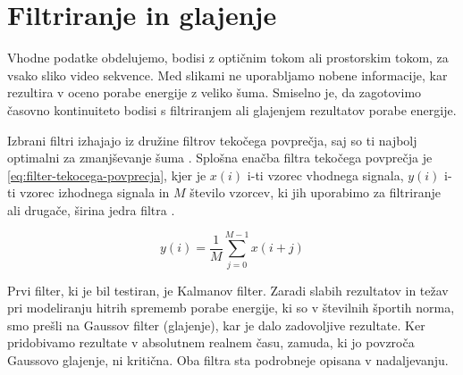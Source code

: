 \section{Filtriranje in glajenje}\label{sec:filtri}
Vhodne podatke obdelujemo, bodisi z optičnim tokom ali prostorskim tokom, za vsako sliko video sekvence. Med slikami ne uporabljamo nobene informacije, kar rezultira v oceno porabe energije z veliko šuma. Smiselno je, da zagotovimo časovno kontinuiteto bodisi s filtriranjem ali glajenjem rezultatov porabe energije.

Izbrani filtri izhajajo iz družine filtrov tekočega povprečja, saj so ti najbolj optimalni za zmanjševanje šuma \cite{smith1997scientist}. Splošna enačba filtra tekočega povprečja je \eqref{eq:filter-tekocega-povprecja}, kjer je $x(i)$ i-ti vzorec vhodnega signala, $y(i)$ i-ti vzorec izhodnega signala in $M$ število vzorcev, ki jih uporabimo za filtriranje ali drugače, širina jedra filtra \cite{smith1997scientist}.

\begin{equation}
y(i) = \frac{1}{M} \sum_{j=0}^{M-1} x(i + j)
\label{eq:filter-tekocega-povprecja}
\end{equation}

Prvi filter, ki je bil testiran, je Kalmanov filter. Zaradi slabih rezultatov in težav pri modeliranju hitrih sprememb porabe energije, ki so v številnih športih norma, smo prešli na Gaussov filter (glajenje), kar je dalo zadovoljive rezultate. Ker pridobivamo rezultate v absolutnem realnem času, zamuda, ki jo povzroča Gaussovo glajenje, ni kritična. Oba filtra sta podrobneje opisana v nadaljevanju.





